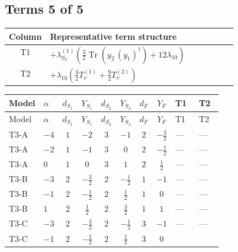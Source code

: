 \documentclass[8pt]{article}
\begin{document}
\begin{landscape}
\subsection*{Terms 5 of 5}
\begin{center}
\begin{tabular}{@{}c >{\raggedright\arraybackslash}p{0.82\linewidth}@{}}
\toprule
Column & Representative term structure \\
\midrule
T1 & \(\displaystyle +{\lambda_{S_2}^{(1)}} \left(\frac{3}{2} \operatorname{Tr}\!\left({y_2}\,\left({y_1}\right)^{\dagger}\right)+12 {\lambda_{10}}\right)\) \\
\midrule
T2 & \(\displaystyle +{\lambda_{10}} \left(\frac{3}{2} T_{\nu}^{(1)}+\frac{9}{2} T_{\nu}^{(2)}\right)\) \\
\midrule
\bottomrule
\end{tabular}
\end{center}
\smallskip
\tiny
\begin{longtable}{@{}llcccccc >{\raggedright\arraybackslash}p{0.21\linewidth} >{\raggedright\arraybackslash}p{0.21\linewidth}@{}}
\toprule
Model & $\alpha$ & $d_{S_1}$ & $Y_{S_1}$ & $d_{S_2}$ & $Y_{S_2}$ & $d_F$ & $Y_F$ & T1 & T2 \\
\midrule
\endfirsthead
\toprule
Model & $\alpha$ & $d_{S_1}$ & $Y_{S_1}$ & $d_{S_2}$ & $Y_{S_2}$ & $d_F$ & $Y_F$ & T1 & T2 \\
\midrule
\endhead
T3-A & $-4$ & $1$ & $-2$ & $3$ & $-1$ & $2$ & $-\frac{3}{2}$ & --- & --- \\
\midrule
T3-A & $-2$ & $1$ & $-1$ & $3$ & $0$ & $2$ & $-\frac{1}{2}$ & --- & --- \\
\midrule
T3-A & $0$ & $1$ & $0$ & $3$ & $1$ & $2$ & $\frac{1}{2}$ & --- & --- \\
\midrule
T3-B & $-3$ & $2$ & $-\frac{3}{2}$ & $2$ & $-\frac{1}{2}$ & $1$ & $-1$ & --- & --- \\
\midrule
T3-B & $-1$ & $2$ & $-\frac{1}{2}$ & $2$ & $\frac{1}{2}$ & $1$ & $0$ & --- & --- \\
\midrule
T3-B & $1$ & $2$ & $\frac{1}{2}$ & $2$ & $\frac{3}{2}$ & $1$ & $1$ & --- & --- \\
\midrule
T3-C & $-3$ & $2$ & $-\frac{3}{2}$ & $2$ & $-\frac{1}{2}$ & $3$ & $-1$ & --- & --- \\
\midrule
T3-C & $-1$ & $2$ & $-\frac{1}{2}$ & $2$ & $\frac{1}{2}$ & $3$ & $0$ & \scriptsize\adjustbox{max width=\linewidth}{$\begin{gathered} +{\lambda_{S_2}^{(1)}} \left(\frac{3}{2} \operatorname{Tr}\!\left({y_2}\,\left({y_1}\right)^{\dagger}\right)+12 {\lambda_{10}}\right)\end{gathered}$} & \scriptsize\adjustbox{max width=\linewidth}{$\begin{gathered} +{\lambda_{10}} \left(\frac{3}{2} T_{\nu}^{(1)}+\frac{9}{2} T_{\nu}^{(2)}\right)\end{gathered}$} \\

\end{longtable}
\end{landscape}
\end{document}
